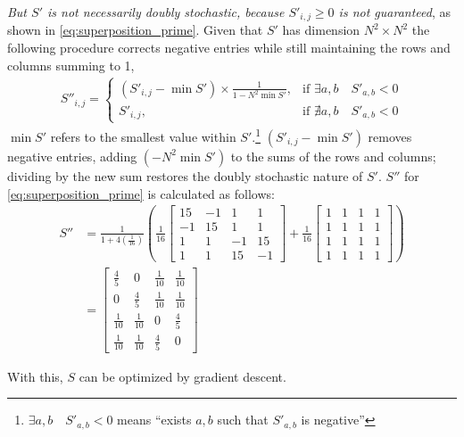 \emph{But $S'$ is not necessarily doubly stochastic, because $S'_{i,j}\geq 0$ is not guaranteed}, as shown in \autoref{eq:superposition_prime}. Given that $S'$ has dimension $N^2\times N^2$ the following procedure corrects negative entries while still maintaining the rows and columns summing to 1,
\begin{align}
 S''_{i,j}=
\begin{cases}
    (S'_{i,j}-\min{S'})\times \frac{1}{1-N^2 \min{S'}}, & \text{if $\exists a,b\quad S'_{a,b}<0$}\\
    S'_{i,j}, & \text{if $\nexists a,b\quad S'_{a,b}<0$}
\end{cases}
\label{eq:superposition_prime_prime}
\end{align}
$\min{S'}$ refers to the smallest value within $S'$.\footnote{$\exists a,b\quad S'_{a,b}<0$ means ``exists $a,b$ such that $S'_{a,b}$ is negative''} $(S'_{i,j}-\min{S'})$ removes negative entries, adding $(-N^2\min{S'})$ to the sums of the rows and columns; dividing by the new sum restores the doubly stochastic nature of $S'$. $S''$ for \autoref{eq:superposition_prime} is calculated as follows:
 \begin{align}
     S''&=\frac{1}{1+4(\frac{1}{16})}
     \left(
    \frac{1}{16}
    \begin{bmatrix}
        15&-1&1&1\\
        -1&15&1&1\\
        1&1&-1&15\\
        1&1&15&-1
    \end{bmatrix}
    +
     \frac{1}{16}
    \begin{bmatrix}
        1&1&1&1\\
        1&1&1&1\\
        1&1&1&1\\
        1&1&1&1
\end{bmatrix}\right)\nonumber\\
&=
\begin{bmatrix}
    \frac{4}{5}&0&\frac{1}{10}&\frac{1}{10}\\[4pt]
    0&\frac{4}{5}&\frac{1}{10}&\frac{1}{10}\\[4pt]
    \frac{1}{10}&\frac{1}{10}&0&\frac{4}{5}\\[4pt]
        \frac{1}{10}&\frac{1}{10}&\frac{4}{5}&0
\end{bmatrix}
\end{align}

With this, $S$ can be optimized by gradient descent.

